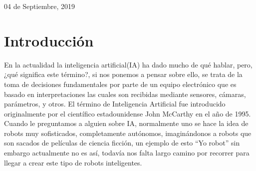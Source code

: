 \documentclass[12pt]{article}
\begin{document}
\begin{center}
\begin{minipage}{0.42\textwidth}
\begin{center}
            \end{center}
        \end{minipage}
        \vspace*{1cm}

        \vspace{2cm}
        \begin{center}
            {\large 04 de Septiembre, 2019}
        \end{center}                                                             
    \end{center}

\newpage

\section{Introducción}
En la actualidad la inteligencia artificial(IA) ha dado mucho de qué hablar, pero, ¿qué significa
este término?, si nos ponemos a pensar sobre ello, se trata de la toma de decisiones fundamentales
por parte de un equipo electrónico que es basado en interpretaciones las cuales son recibidas
mediante sensores, cámaras, parámetros, y otros. El término de Inteligencia Artificial fue
introducido originalmente por el científico estadounidense John McCarthy en el año de 1995.
Cuando le preguntamos a alguien sobre IA, normalmente uno se hace la idea de robots muy
sofisticados, completamente autónomos, imaginándonos a robots que son sacados de películas de
ciencia ficción, un ejemplo de esto “Yo robot” sin embargo actualmente no es así, todavía nos falta
largo camino por recorrer para llegar a crear este tipo de robots inteligentes.\\
\end{document}
